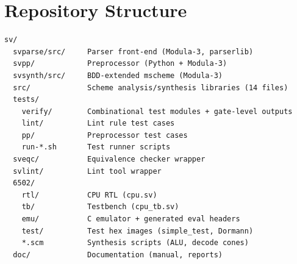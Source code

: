 \documentclass[11pt]{article}
\begin{document}
\section{Repository Structure}

\begin{lstlisting}[language={},basicstyle=\ttfamily\footnotesize]
sv/
  svparse/src/     Parser front-end (Modula-3, parserlib)
  svpp/            Preprocessor (Python + Modula-3)
  svsynth/src/     BDD-extended mscheme (Modula-3)
  src/             Scheme analysis/synthesis libraries (14 files)
  tests/
    verify/        Combinational test modules + gate-level outputs
    lint/          Lint rule test cases
    pp/            Preprocessor test cases
    run-*.sh       Test runner scripts
  sveqc/           Equivalence checker wrapper
  svlint/          Lint tool wrapper
  6502/
    rtl/           CPU RTL (cpu.sv)
    tb/            Testbench (cpu_tb.sv)
    emu/           C emulator + generated eval headers
    test/          Test hex images (simple_test, Dormann)
    *.scm          Synthesis scripts (ALU, decode cones)
  doc/             Documentation (manual, reports)
\end{lstlisting}
\end{document}

